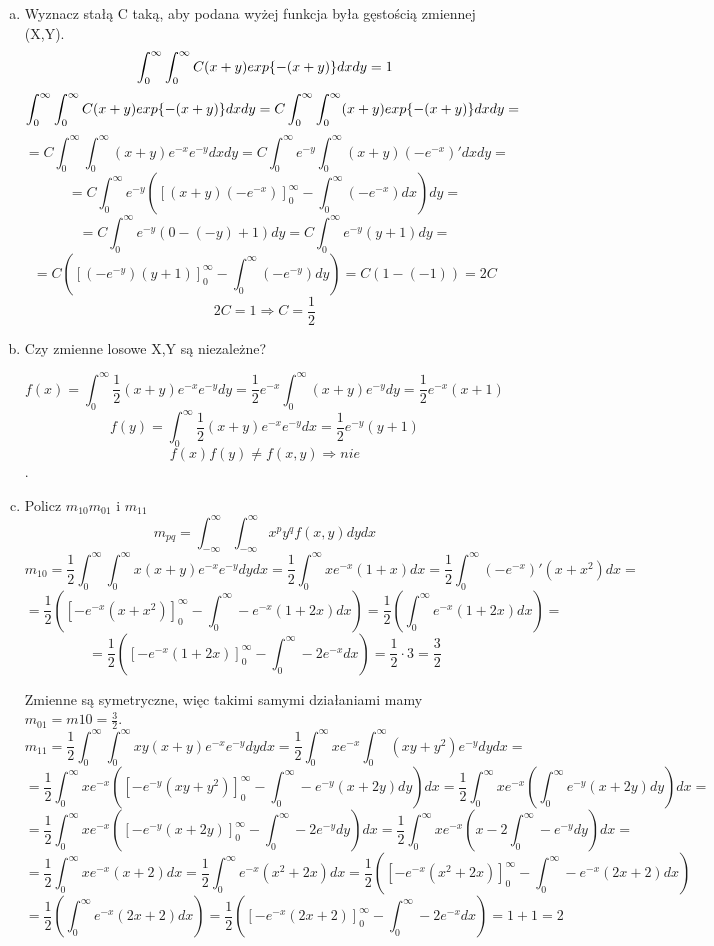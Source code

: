 \documentclass[a4paper]{article}
\DeclarePairedDelimiter\set{\lbrace}{\rbrace}
\begin{document}
\begin{enumerate}[(a)]
\item Wyznacz stałą C taką, aby podana wyżej funkcja była gęstością zmiennej (X,Y).
$$\int_0^\infty \int_0^\infty C(x+y)exp\set{-(x+y)} dx dy = 1 $$ 
$$\int_0^\infty \int_0^\infty C(x+y)exp\set{-(x+y)} dx dy= C\int_0^\infty \int_0^\infty (x+y)exp\set{-(x+y)} dx dy=$$  $$=C\int_0^\infty \int_0^\infty (x+y)e^{-x}e^{-y} dx dy =C \int_0^\infty e^{-y} \int_0^\infty (x+y)(-e^{-x})' dx dy =$$
$$=C \int_0^\infty e^{-y} \left( \left[(x+y)(-e^{-x})\right]_0^\infty - \int_0^\infty(-e^{-x}) dx  \right)  dy = $$ 
$$= C \int_0^\infty e^{-y} \left( 0-(-y) + 1 \right) dy = C \int_0^\infty e^{-y}(y+1) dy = $$ 
$$=C \left( \left[(-e^{-y})(y+1)\right]_0^\infty - \int_0^\infty(-e^{-y}) dy\right) = C \left(1 - (-1)\right) = 2C$$
$$2C=1 \Rightarrow C=\frac{1}{2} $$

\item Czy zmienne losowe X,Y są niezależne?

$$f(x)=\int_0^\infty \frac{1}{2}(x+y)e^{-x}e^{-y} dy = \frac{1}{2}e^{-x} \int_0^\infty (x+y)e^{-y} dy = \frac{1}{2}e^{-x}(x+1)$$
$$f(y)=\int_0^\infty \frac{1}{2}(x+y)e^{-x}e^{-y} dx = \frac{1}{2}e^{-y}(y+1)  $$
$$f(x)f(y)\neq f(x,y) \Rightarrow nie $$.

\item Policz $m_{10} m_{01}$ i $m_{11}$
$$m_{pq}=\int_{-\infty}^\infty \int_{-\infty}^\infty x^p y^q f(x,y) dy dx  $$
$$m_{10}=\frac{1}{2} \int_0^\infty \int_0^\infty x (x+y)e^{-x}e^{-y} dy dx = \frac{1}{2} \int_0^\infty xe^{-x}(1+x) dx=\frac{1}{2} \int_0^\infty (-e^{-x})'(x+x^2) dx = $$
$$=\frac{1}{2} \left( \left[-e^{-x}(x+x^2) \right]_0^\infty -  \int_0^\infty -e^{-x}(1+2x)dx \right) = \frac{1}{2} \left(\int_0^\infty e^{-x}(1+2x)dx \right) =$$ $$=\frac{1}{2} \left( \left[ -e^{-x}(1+2x) \right]_0^\infty - \int_0^\infty -2e^{-x}dx \right) =\frac{1}{2}\cdot 3  = \frac{3}{2}$$

Zmienne są symetryczne, więc takimi samymi działaniami mamy $m_{01}=m{10}=\frac{3}{2}$.\\

$$m_{11}= \frac{1}{2} \int_0^\infty \int_0^\infty x y (x+y)e^{-x}e^{-y} dy dx = \frac{1}{2} \int_0^\infty xe^{-x} \int_0^\infty (xy+y^2)e^{-y} dy dx = $$ $$=\frac{1}{2} \int_0^\infty xe^{-x}\left( \left[ -e^{-y}(xy+y^2) \right]_0^\infty - \int_0^\infty -e^{-y} (x+2y) dy\right) dx =\frac{1}{2} \int_0^\infty xe^{-x}\left(\int_0^\infty e^{-y} (x+2y) dy\right) dx =$$
$$=\frac{1}{2} \int_0^\infty xe^{-x}\left( \left[ -e^{-y}(x+2y) \right]_0^\infty - \int_0^\infty -2e^{-y} dy\right) dx = \frac{1}{2} \int_0^\infty xe^{-x}\left(x-2\int_0^\infty -e^{-y} dy\right) dx=$$ $$=\frac{1}{2} \int_0^\infty xe^{-x}(x+2) dx = \frac{1}{2} \int_0^\infty e^{-x}(x^2+2x) dx =\frac{1}{2} \left( \left[ -e^{-x}(x^2+2x) \right]_0^\infty - \int_0^\infty -e^{-x}(2x+2) dx \right) $$ 
$$=\frac{1}{2} \left(\int_0^\infty e^{-x}(2x+2) dx \right) = \frac{1}{2} \left(\left[ -e^{-x}(2x+2) \right]_0^\infty - \int_0^\infty -2e^{-x} dx \right) = 1+1 = 2  $$


\end{enumerate}
\end{document}
